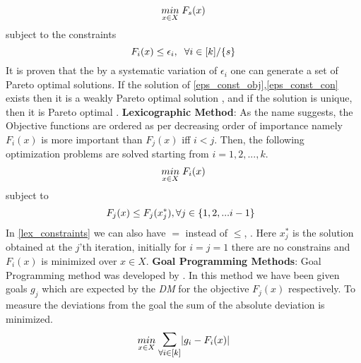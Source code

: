 \begin{equation}\label{eps_const_obj}
    \underset{x \in X}{min}\hspace{1mm} F_s(x)
\end{equation}
\newline subject to the constraints
\begin{equation}\label{eps_const_con}
    F_i(x) \le \epsilon_i,\hspace{2mm} \forall i \in [k]/\{s\}
\end{equation}\newline
It is proven that the by a systematic variation of $\epsilon_i$ one can generate a set of Pareto optimal solutions\cite{hwang1979methods}.
If the solution of \ref{eps_const_obj},\ref{eps_const_con} exists then it is a weakly Pareto optimal solution \cite{miettinen2012nonlinear}, and if the solution is unique, then it is Pareto optimal \cite{miettinen2012nonlinear}.
\newline \newline \textbf{Lexicographic Method}: As the name suggests, the Objective functions are ordered as per decreasing order of importance namely $F_i(x)$ is more important than $F_j(x)$ iff $i<j$. Then, the following optimization problems are solved starting from $i=1,2,...,k$.
\begin{equation} \label{lex_obj}
    \underset{x\in X}{min}\hspace{1mm} F_i(x)
\end{equation}
\newline subject to
\begin{equation} \label{lex_constraints}
    F_j(x) \le F_j(x^{*}_j), \forall j \in \{1,2,...i-1\}\hspace{2mm}
\end{equation}
\newline In \ref{lex_constraints} we can also have $=$ instead of $\le$, \cite{stadler1988multicriteria}. Here $x^{*}_j$ is the solution obtained at the $j$'th iteration, initially for $i=j=1$ there are no constrains and $F_i(x)$ is minimized over $x\in X$. 
\newline \newline \textbf{Goal Programming Methods}: Goal Programming method was developed by \cite{charnes1955optimal}\cite{ijiri1965management}\cite{charnes1967effective}. In this method we have been given goals $g_j$ which are expected by the \textit{DM} for the objective $F_j(x)$ respectively. To measure the deviations from the goal the sum of the absolute deviation is minimized. 
\begin{equation}
    \underset{x\in X}{min} \hspace{1mm}\mathlarger{\mathlarger{\sum}}_{\forall i\in [k]} |g_i - F_i(x)|
\end{equation}
